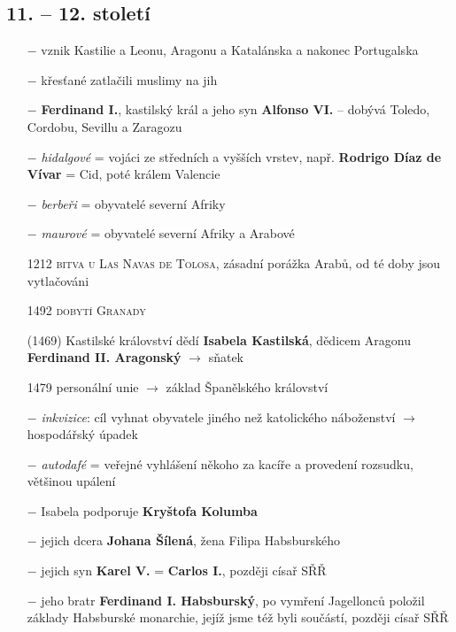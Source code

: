 \documentclass{article}
\begin{document}
\subsection*{11. -- 12. století}
\begin{itemize}
    \vspace{-0.5em}
    \setlength\itemsep{0.15em}
    \item[$-$] vznik Kastilie a Leonu, Aragonu a Katalánska a nakonec Portugalska
    \item[$-$] křesťané zatlačili muslimy na jih
    \item[$-$] \textbf{Ferdinand I.}, kastilský král a jeho syn \textbf{Alfonso VI.} -- dobývá Toledo, Cordobu, Sevillu a Zaragozu
    \item[$-$] \textit{hidalgové} = vojáci ze středních a vyšších vrstev, např. \textbf{Rodrigo Díaz de Vívar} = Cid, poté králem Valencie
    \item[$-$] \textit{berbeři} = obyvatelé severní Afriky
    \item[$-$] \textit{maurové} = obyvatelé severní Afriky a Arabové
    \item[1212] \textsc{bitva u Las Navas de Tolosa}, zásadní porážka Arabů, od té doby jsou vytlačováni
    \item[1492] \textsc{dobytí Granady}
    \item[(1469)] Kastilské království dědí \textbf{Isabela Kastilská}, dědicem Aragonu \textbf{Ferdinand II. Aragonský} $\rightarrow$ sňatek
    \item[1479] personální unie $\rightarrow$ základ Španělského království
    \item[$-$] \textit{inkvizice}: cíl vyhnat obyvatele jiného než katolického náboženství $\rightarrow$ hospodářský úpadek
    \item[$-$] \textit{autodafé} = veřejné vyhlášení někoho za kacíře a provedení rozsudku, většinou upálení
    \item[$-$] Isabela podporuje \textbf{Kryštofa Kolumba}
    \item[$-$] jejich dcera \textbf{Johana Šílená}, žena Filipa Habsburského
    \item[$-$] jejich syn \textbf{Karel V.} = \textbf{Carlos I.}, později císař SŘŘ
    \item[$-$] jeho bratr \textbf{Ferdinand I. Habsburský}, po vymření Jagellonců položil základy Habsburské monarchie, jejíž jsme též byli součástí, později císař SŘŘ
\end{itemize}
\end{document}
